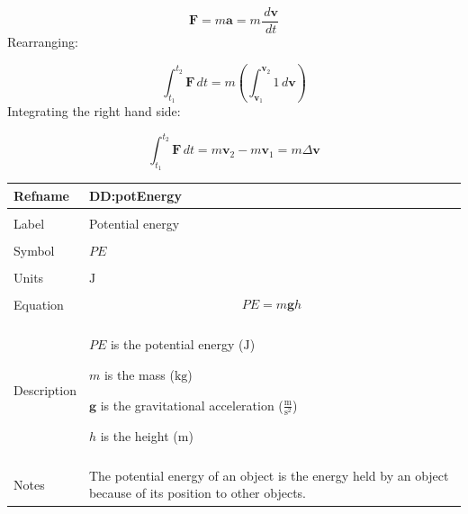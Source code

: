 \documentclass[12pt]{article}
\begin{document}
\begin{displaymath}
\mathbf{F}=m \mathbf{a}=m \frac{\,d\mathbf{v}}{\,dt}
\end{displaymath}
Rearranging:

\begin{displaymath}
\int_{{t_{1}}}^{{t_{2}}}{\mathbf{F}}\,dt=m \left(\int_{{\mathbf{v}_{1}}}^{{\mathbf{v}_{2}}}{1}\,d\mathbf{v}\right)
\end{displaymath}
Integrating the right hand side:

\begin{displaymath}
\int_{{t_{1}}}^{{t_{2}}}{\mathbf{F}}\,dt=m {\mathbf{v}_{2}}-m {\mathbf{v}_{1}}=m Δ\mathbf{v}
\end{displaymath}
\vspace{\baselineskip}
\noindent
\begin{minipage}{\textwidth}
\begin{tabular}{>{\raggedright}p{}>{\raggedright\arraybackslash}p{}}
\toprule \textbf{Refname} & \textbf{DD:potEnergy}
\label{DD:potEnergy}
\\ \midrule \\
Label & Potential energy
        
\\ \midrule \\
Symbol & $PE$
         
\\ \midrule \\
Units & ${\text{J}}$
        
\\ \midrule \\
Equation & \begin{displaymath}
           PE=m \mathbf{g} h
           \end{displaymath}
\\ \midrule \\
Description & \begin{symbDescription}
              \item{$PE$ is the potential energy (${\text{J}}$)}
              \item{$m$ is the mass (${\text{kg}}$)}
              \item{$\mathbf{g}$ is the gravitational acceleration ($\frac{\text{m}}{\text{s}^{2}}$)}
              \item{$h$ is the height (${\text{m}}$)}
              \end{symbDescription}
\\ \midrule \\
Notes & The potential energy of an object is the energy held by an object because of its position to other objects.
        

\end{tabular}
\end{minipage}
\end{document}
